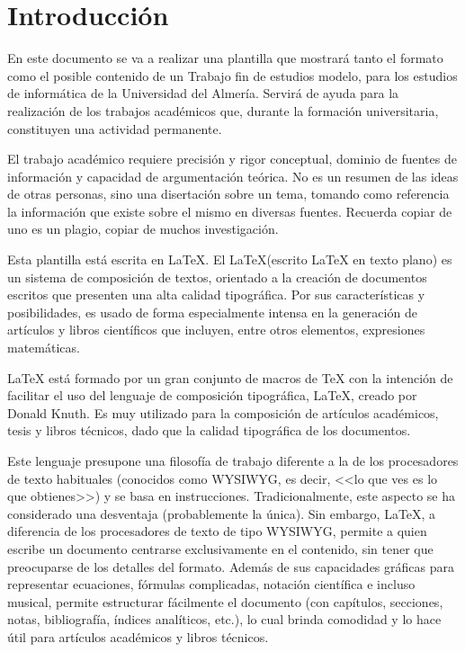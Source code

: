 
\chapter {Introducción}
\label{sec:intro}


En este documento se va a realizar una plantilla que mostrará tanto el formato como el posible contenido de un Trabajo fin de estudios modelo, para los estudios de informática de la Universidad del Almería.
Servirá de  ayuda  para  la  realización  de  los trabajos  académicos  que,  durante  la  formación  universitaria,  constituyen  una  actividad  permanente.

El trabajo académico requiere precisión y rigor conceptual, dominio de fuentes de información y capacidad de argumentación teórica.  No es un  resumen de las ideas de otras personas, sino una disertación sobre un tema, tomando como referencia  la información  que existe sobre el  mismo en diversas fuentes. Recuerda copiar de uno es un plagio, copiar de muchos investigación. \cite{malaga}

Esta  plantilla está escrita en \LaTeX.
El \LaTeX (escrito LaTeX en texto plano) es un sistema de composición de textos, orientado a la creación de documentos escritos que presenten una alta calidad tipográfica. Por sus características y posibilidades, es usado de forma especialmente intensa en la generación de artículos y libros científicos que incluyen, entre otros elementos, expresiones matemáticas. \cite{wiki}

LaTeX está formado por un gran conjunto de macros de TeX con la intención de facilitar el uso del lenguaje de composición tipográfica,  \LaTeX, creado por Donald Knuth. Es muy utilizado para la composición de artículos académicos, tesis y libros técnicos, dado que la calidad tipográfica de los documentos. 

Este lenguaje presupone una filosofía de trabajo diferente a la de los procesadores de texto habituales (conocidos como WYSIWYG, es decir, <<lo que ves es lo que obtienes>>) y se basa en instrucciones. Tradicionalmente, este aspecto se ha considerado una desventaja (probablemente la única). Sin embargo, LaTeX, a diferencia de los procesadores de texto de tipo WYSIWYG, permite a quien escribe un documento centrarse exclusivamente en el contenido, sin tener que preocuparse de los detalles del formato. Además de sus capacidades gráficas para representar ecuaciones, fórmulas complicadas, notación científica e incluso musical, permite estructurar fácilmente el documento (con capítulos, secciones, notas, bibliografía, índices analíticos, etc.), lo cual brinda comodidad y lo hace útil para artículos académicos y libros técnicos.

